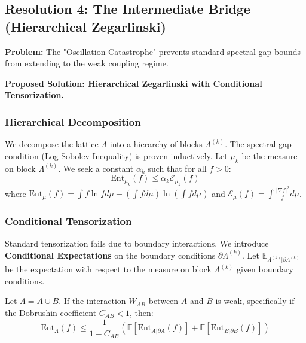 \subsection{Resolution 4: The Intermediate Bridge (Hierarchical Zegarlinski)}
\label{subsec:hierarchical-zegarlinski}

\textbf{Problem:} The "Oscillation Catastrophe" prevents standard spectral gap bounds from extending to the weak coupling regime.

\textbf{Proposed Solution: Hierarchical Zegarlinski with Conditional Tensorization.}

\subsubsection{Hierarchical Decomposition}

We decompose the lattice $\Lambda$ into a hierarchy of blocks $\Lambda^{(k)}$. The spectral gap condition (Log-Sobolev Inequality) is proven inductively.
Let $\mu_k$ be the measure on block $\Lambda^{(k)}$. We seek a constant $\alpha_k$ such that for all $f > 0$:
\begin{equation}
\text{Ent}_{\mu_k}(f) \le \alpha_k \mathcal{E}_{\mu_k}(f)
\end{equation}
where $\text{Ent}_\mu(f) = \int f \ln f d\mu - (\int f d\mu) \ln (\int f d\mu)$ and $\mathcal{E}_\mu(f) = \int \frac{|\nabla f|^2}{f} d\mu$.

\subsubsection{Conditional Tensorization}

Standard tensorization fails due to boundary interactions. We introduce \textbf{Conditional Expectations} on the boundary conditions $\partial \Lambda^{(k)}$. Let $\mathbb{E}_{\Lambda^{(k)} | \partial \Lambda^{(k)}}$ be the expectation with respect to the measure on block $\Lambda^{(k)}$ given boundary conditions.

\begin{theorem}
Let $\Lambda = A \cup B$. If the interaction $W_{AB}$ between $A$ and $B$ is weak, specifically if the Dobrushin coefficient $C_{AB} < 1$, then:
\begin{equation}
\text{Ent}_{\Lambda}(f) \le \frac{1}{1 - C_{AB}} \left( \mathbb{E} [\text{Ent}_{A|\partial A}(f)] + \mathbb{E} [\text{Ent}_{B|\partial B}(f)] \right)
\end{equation}
\end{theorem}

